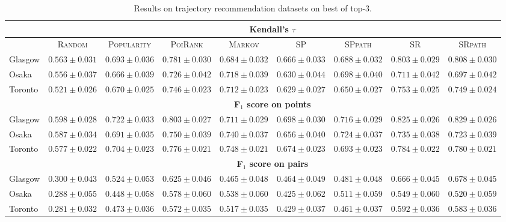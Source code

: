 \begin{table*}[!h]
\caption{Results on trajectory recommendation datasets on best of top-3.}
\centering
\scriptsize
\setlength{\tabcolsep}{3pt} %
\begin{tabular}{l|cc|ccc|ccc} \hline
& \multicolumn{8}{c}{\bf Kendall's $\tau$} \\ \hline
 & \textsc{Random} & \textsc{Popularity} & \textsc{PoiRank} & \textsc{Markov} & \textsc{SP} & \textsc{SPpath} & \textsc{SR} & \textsc{SRpath} \\ \hline
Glasgow & $0.563\pm0.031$ & $0.693\pm0.036$ & $0.781\pm0.030$ & $0.684\pm0.032$ & $0.666\pm0.033$ & $0.688\pm0.032$ & $\mathit{0.803\pm0.029}$ & $\mathbf{0.808\pm0.030}$ \\
Osaka & $0.556\pm0.037$ & $0.666\pm0.039$ & $\mathbf{0.726\pm0.042}$ & $\mathit{0.718\pm0.039}$ & $0.630\pm0.044$ & $0.698\pm0.040$ & $0.711\pm0.042$ & $0.697\pm0.042$ \\
Toronto & $0.521\pm0.026$ & $0.670\pm0.025$ & $0.746\pm0.023$ & $0.712\pm0.023$ & $0.629\pm0.027$ & $0.650\pm0.027$ & $\mathbf{0.753\pm0.025}$ & $\mathit{0.749\pm0.024}$ \\
\hline
& \multicolumn{8}{c}{\bf F$_1$ score on points} \\ \hline
Glasgow & $0.598\pm0.028$ & $0.722\pm0.033$ & $0.803\pm0.027$ & $0.711\pm0.029$ & $0.698\pm0.030$ & $0.716\pm0.029$ & $\mathit{0.825\pm0.026}$ & $\mathbf{0.829\pm0.026}$ \\
Osaka & $0.587\pm0.034$ & $0.691\pm0.035$ & $\mathbf{0.750\pm0.039}$ & $\mathit{0.740\pm0.037}$ & $0.656\pm0.040$ & $0.724\pm0.037$ & $0.735\pm0.038$ & $0.723\pm0.039$ \\
Toronto & $0.577\pm0.022$ & $0.704\pm0.023$ & $0.776\pm0.021$ & $0.748\pm0.021$ & $0.674\pm0.023$ & $0.693\pm0.023$ & $\mathbf{0.784\pm0.022}$ & $\mathit{0.780\pm0.021}$ \\
\hline
& \multicolumn{8}{c}{\bf F$_1$ score on pairs} \\ \hline
Glasgow & $0.300\pm0.043$ & $0.524\pm0.053$ & $0.625\pm0.046$ & $0.465\pm0.048$ & $0.464\pm0.049$ & $0.481\pm0.048$ & $\mathit{0.666\pm0.045}$ & $\mathbf{0.678\pm0.045}$ \\
Osaka & $0.288\pm0.055$ & $0.448\pm0.058$ & $\mathbf{0.578\pm0.060}$ & $0.538\pm0.060$ & $0.425\pm0.062$ & $0.511\pm0.059$ & $\mathit{0.549\pm0.060}$ & $0.520\pm0.059$ \\
Toronto & $0.281\pm0.032$ & $0.473\pm0.036$ & $0.572\pm0.035$ & $0.517\pm0.035$ & $0.429\pm0.037$ & $0.461\pm0.037$ & $\mathbf{0.592\pm0.036}$ & $\mathit{0.583\pm0.036}$ \\
\hline
\end{tabular}
\end{table*}


